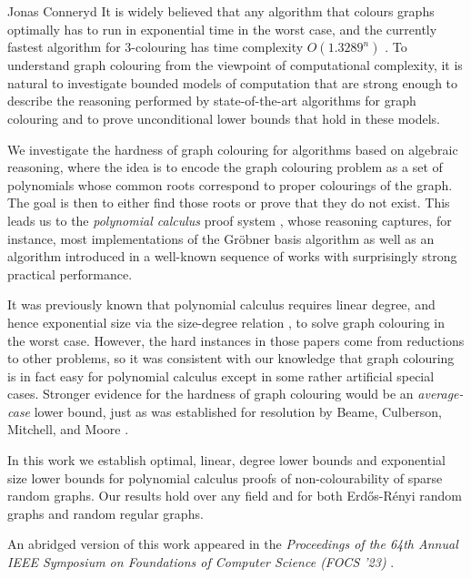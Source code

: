 \documentclass[report]{owrart}
\begin{document}
\begin{report}
\begin{talk}{Jonas Conneryd}
It is widely believed that any algorithm
that colours graphs optimally
has to run
in exponential time in the worst case, and the currently
fastest algorithm for $3$\nobreakdash-colouring
has time complexity $O(1.3289^{n})$
\cite{Beigel05ColoringFixed}. To understand graph colouring from 
the viewpoint of computational complexity,
it is natural to investigate bounded models of computation
that are strong enough to describe the reasoning 
performed
by state-of-the-art 
algorithms for graph colouring and to prove unconditional lower bounds
that hold in 
these models. 

We investigate the hardness of graph colouring for algorithms based on algebraic reasoning, where the idea is to encode the graph colouring problem as a set of polynomials whose common roots correspond to proper colourings of the graph. The goal is then to either find those roots or prove that they do not exist. This leads us to the \emph{polynomial calculus} proof system \cite{CEI96Groebner, ABRW02SpaceComplexity}, whose reasoning captures, for instance, most implementations of the Gr\"{o}bner basis algorithm as well as an algorithm introduced in a well-known sequence of works \cite{DLMM08Hilbert,DLMO09ExpressingCombinatorial,DLMM11ComputingInfeasibility,DMPRRSSS15GraphColouring} with surprisingly strong practical performance. 

It was previously known \cite{LN17GraphColouring,  AO19ProofCplx} that polynomial calculus requires linear degree, and hence exponential size via the size-degree relation \cite{IPS99Lower}, to solve graph colouring in the worst case. However, the hard instances in those papers come from reductions to other problems, so it was consistent with our knowledge that graph colouring is in fact easy for polynomial calculus except in some rather artificial special cases. Stronger evidence for the hardness of graph colouring would be an \emph{average-case} lower bound, just as was established for resolution by Beame, Culberson, Mitchell, and Moore \cite{BCCM05RandomGraph}. 

In this work we establish optimal,
linear, degree lower bounds
and exponential size lower bounds
for polynomial calculus proofs of non-colourability of sparse random graphs. Our results hold over any field and for both Erd\H{o}s-R\'{e}nyi random graphs and random regular graphs.  

An abridged version of this work appeared in the \emph{Proceedings of
the 64th Annual IEEE Symposium on Foundations of Computer Science
(FOCS '23)} \cite{CdRNPR23GraphColouring}.



\end{talk}
\end{report}
\end{document}
